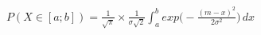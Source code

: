 \documentclass[preview]{standalone}
\begin{document}
\begin{align*}
P( X \in [a;b] ) = { \frac{1}{\sqrt{\pi}} } \times { \frac{1}{\sigma \sqrt{2}} } \int_a^b { exp\Big(-{ \frac{(m - x)^2}{2 \sigma^2} }\Big) } \, dx
\end{align*}
\end{document}
